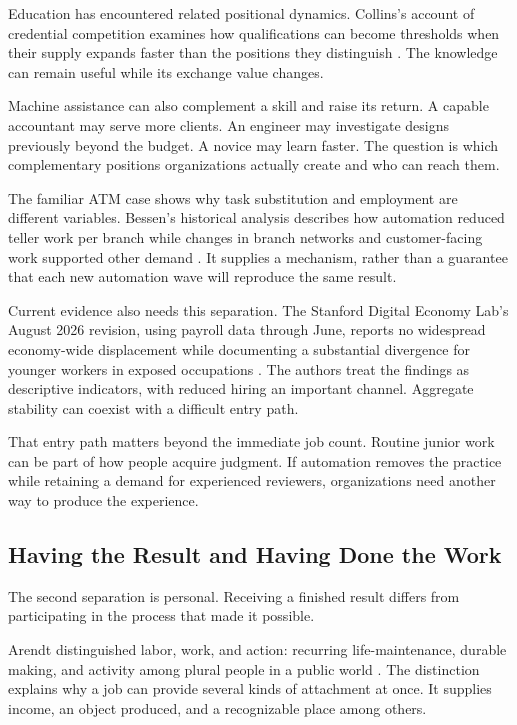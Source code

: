 \documentclass[11pt,openany]{book}
\begin{document}
Education has encountered related positional dynamics. Collins's account of credential competition examines how qualifications can become thresholds when their supply expands faster than the positions they distinguish \cite{collins1979credential}. The knowledge can remain useful while its exchange value changes.

Machine assistance can also complement a skill and raise its return. A capable accountant may serve more clients. An engineer may investigate designs previously beyond the budget. A novice may learn faster. The question is which complementary positions organizations actually create and who can reach them.

The familiar ATM case shows why task substitution and employment are different variables. Bessen's historical analysis describes how automation reduced teller work per branch while changes in branch networks and customer-facing work supported other demand \cite{bessen2015learning}. It supplies a mechanism, rather than a guarantee that each new automation wave will reproduce the same result.

Current evidence also needs this separation. The Stanford Digital Economy Lab's August 2026 revision, using payroll data through June, reports no widespread economy-wide displacement while documenting a substantial divergence for younger workers in exposed occupations \cite{brynjolfsson2026canaries}. The authors treat the findings as descriptive indicators, with reduced hiring an important channel. Aggregate stability can coexist with a difficult entry path.

That entry path matters beyond the immediate job count. Routine junior work can be part of how people acquire judgment. If automation removes the practice while retaining a demand for experienced reviewers, organizations need another way to produce the experience.

\subsection{Having the Result and Having Done the Work}

The second separation is personal. Receiving a finished result differs from participating in the process that made it possible.

Arendt distinguished labor, work, and action: recurring life-maintenance, durable making, and activity among plural people in a public world \cite{arendt1958human}. The distinction explains why a job can provide several kinds of attachment at once. It supplies income, an object produced, and a recognizable place among others.
\end{document}
